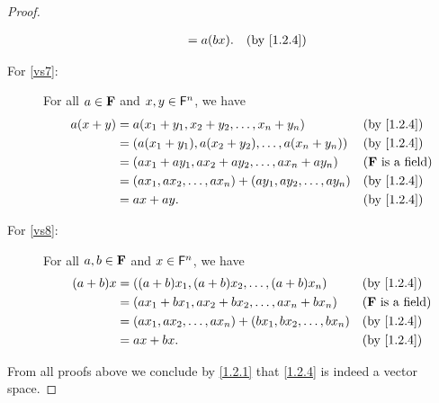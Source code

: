 \begin{proof}
\begin{description}
\begin{align*}
                         & = a \p{bx}.                                              &  & \text{(by \cref{1.2.4})}
            \end{align*}
        \item[For \ref{vs7}:]
            For all \(a \in \mathbf{F}\) and \(x, y \in \mathsf{F}^{n}\), we have
            \begin{align*}
                a \p{x + y} & = a \p{x_{1} + y_{1}, x_{2} + y_{2}, \dots, x_{n} + y_{n}}                    &  & \text{(by \cref{1.2.4})}   \\
                            & = \p{a \p{x_{1} + y_{1}}, a \p{x_{2} + y_{2}}, \dots, a \p{x_{n} + y_{n}}}    &  & \text{(by \cref{1.2.4})}   \\
                            & = \p{a x_{1} + a y_{1}, a x_{2} + a y_{2}, \dots, a x_{n} + a y_{n}}          &  & \text{(\(\F\) is a field)} \\
                            & = \p{a x_{1}, a x_{2}, \dots, a x_{n}} + \p{a y_{1}, a y_{2}, \dots, a y_{n}} &  & \text{(by \cref{1.2.4})}   \\
                            & = a x + a y.                                                                  &  & \text{(by \cref{1.2.4})}
            \end{align*}
        \item[For \ref{vs8}:]
            For all \(a, b \in \mathbf{F}\) and \(x \in \mathsf{F}^{n}\), we have
            \begin{align*}
                \p{a + b} x & = \p{\p{a + b} x_{1}, \p{a + b} x_{2}, \dots, \p{a + b} x_{n}}                &  & \text{(by \cref{1.2.4})}   \\
                            & = \p{a x_{1} + b x_{1}, a x_{2} + b x_{2}, \dots, a x_{n} + b x_{n}}          &  & \text{(\(\F\) is a field)} \\
                            & = \p{a x_{1}, a x_{2}, \dots, a x_{n}} + \p{b x_{1}, b x_{2}, \dots, b x_{n}} &  & \text{(by \cref{1.2.4})}   \\
                            & = a x + b x.                                                                  &  & \text{(by \cref{1.2.4})}
            \end{align*}
    \end{description}
    From all proofs above we conclude by \cref{1.2.1} that \cref{1.2.4} is indeed a vector space.
\end{proof}

